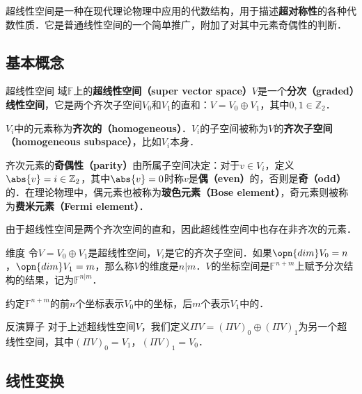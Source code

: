 

超线性空间是一种在现代理论物理中应用的代数结构，用于描述\textbf{超对称性}的各种代数性质．它是普通线性空间的一个简单推广，附加了对其中元素奇偶性的判断．

\subsection{基本概念}

\begin{definition}{超线性空间}
域$\mathbb{F}$上的\textbf{超线性空间（super vector space）}$V$是一个\textbf{分次（graded）线性空间}，它是两个齐次子空间$V_0$和$V_1$的直和：$V=V_0\oplus V_1$，其中$0, 1\in \mathbb{Z}_2$．
\end{definition}


$V_i$中的元素称为\textbf{齐次的（homogeneous）}．$V_i$的子空间被称为$V$的\textbf{齐次子空间（homogeneous subspace）}，比如$V_i$本身．

齐次元素的\textbf{奇偶性（parity）}由所属子空间决定：对于$v\in V_i$，定义$\abs{v}=i\in\mathbb{Z}_2$，其中$\abs{v}=0$时称$v$是\textbf{偶（even）}的，否则是\textbf{奇（odd）}的．在理论物理中，偶元素也被称为\textbf{玻色元素（Bose element）}，奇元素则被称为\textbf{费米元素（Fermi element）}．

由于超线性空间是两个齐次空间的直和，因此超线性空间中也存在非齐次的元素．

\begin{definition}{维度}
令$V=V_0\oplus V_1$是超线性空间，$V_i$是它的齐次子空间．如果$\opn{dim}V_0=n$，$\opn{dim}V_1=m$，那么称$V$的维度是$n|m$．$V$的坐标空间是$\mathbb{F}^{n+m}$上赋予分次结构的结果，记为$\mathbb{F}^{n|m}$．

约定$\mathbb{F}^{n+m}$的前$n$个坐标表示$V_0$中的坐标，后$m$个表示$V_1$中的．
\end{definition}

\begin{definition}{反演算子}
对于上述超线性空间$V$，我们定义$\Pi V=(\Pi V)_0\oplus(\Pi V)_1$为另一个超线性空间，其中$(\Pi V)_0=V_1$，$(\Pi V)_1=V_0$．
\end{definition}


\subsection{线性变换}

